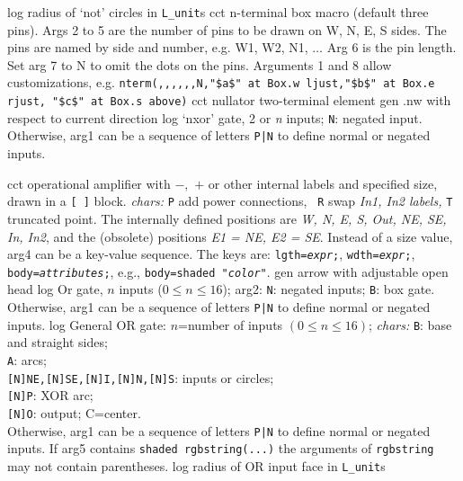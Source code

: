   {log}%
  {radius of `not' circles in {\tt L\_unit}s}%
%
  {cct}%
  {n-terminal box macro (default three pins).
   Args 2 to 5 are the number of pins to be drawn on W, N, E, S
   sides.  The pins are named by side and number, e.g. W1, W2, N1,
   $\ldots$ Arg 6 is the pin length.  Set arg 7 to N to omit the
   dots on the pins. Arguments 1 and 8 allow customizations, e.g.
   {\tt nterm(,{,},{,},{,}N,"\$a\$" at Box.w ljust,"\$b\$" at Box.e rjust,
      "\$c\$" at Box.s above)} }%
%
  {cct}%
  { nullator two-terminal element }%
%
  {gen}%
  {.nw with respect to current direction}%
%
  {log}%
  {`nxor' gate, 2 or {\sl n\/} inputs; {\tt N}: negated input.
   Otherwise, arg1 can be a sequence of letters {\tt P|N} to define
   normal or negated inputs.
    }%

%

%
  {cct}%
  {operational amplifier with $-,$ $+$ or other internal labels and
    specified size, drawn in a {\tt [ ]} block.
    {\sl chars:} {\tt P} add power connections, {\tt
    R} swap {\sl In1, In2 labels,} {\tt T} truncated point.  The internally
    defined positions are {\sl W, N, E, S, Out, NE, SE, In, In2}, and
    the (obsolete) positions {\sl E1 = NE, E2 = SE}. Instead of a size
    value, arg4 can be a key-value sequence.  The keys are:
    {\tt lgth={\sl expr};}, 
    {\tt wdth={\sl expr};}, 
    {\tt body={\sl attributes};}, e.g., {\tt body=shaded "{\sl color}"}. 
   }%
%
  {gen}%
  {arrow with adjustable open head}%
%
  {log}%
  {Or gate, $n$ inputs ($0 \leq n \leq 16$); arg2: {\tt N}: negated inputs;
   {\tt B}: box gate.
   Otherwise, arg1 can be a sequence of letters {\tt P|N} to define
   normal or negated inputs.
    }%
%
  {log}%
  {General OR gate: $n$=number of inputs $(0\leq n\leq 16)$;
    {\sl chars:}%
    {\tt B}: base and straight sides;\\ 
    {\tt A}: arcs;\\
    {\tt [N]NE,[N]SE,[N]I,[N]N,[N]S}: inputs or circles;\\ 
    {\tt [N]P}: XOR arc;\\
    {\tt [N]O}: output; C=center.\\
   Otherwise, arg1 can be a sequence of letters {\tt P|N} to define
   normal or negated inputs.  If arg5 contains {\tt shaded rgbstring(...)}
   the arguments of {\tt rgbstring} may not contain parentheses.}%
%
  {log}%
  {radius of OR input face in {\tt L\_unit}s}%

